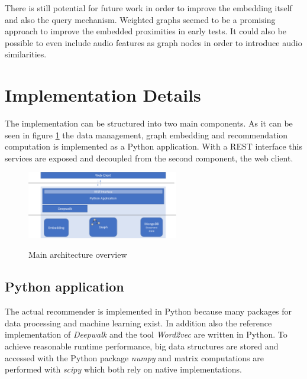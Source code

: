 \documentclass[sigconf]{acmart}
\begin{document}
There is still potential for future work in order to improve the embedding itself and also the query mechanism. Weighted graphs seemed to be a promising approach to improve the embedded proximities in early tests. It could also be possible to even include audio features as graph nodes in order to introduce audio similarities. %






\newpage
\appendix
\section{Implementation Details}

The implementation can be structured into two main components. As it can be seen in figure \ref{fig:architecture} the data management, graph embedding and recommendation computation is implemented as a Python application. With a REST interface this services are exposed and decoupled from the second component, the web client.

\begin{figure}[ht]
	{\includegraphics[width=250px]{architecture.png}}	
	\caption{Main architecture overview}
	\label{fig:architecture}
\end{figure}

\subsection{Python application}
The actual recommender is implemented in Python because many packages for data processing and machine learning exist. In addition also the reference implementation of \emph{Deepwalk} and the tool \emph{Word2vec} are written in Python. To achieve reasonable runtime performance, big data structures are stored and accessed with the Python package \emph{numpy} and matrix computations are performed with \emph{scipy} which both rely on native implementations.

\end{document}
